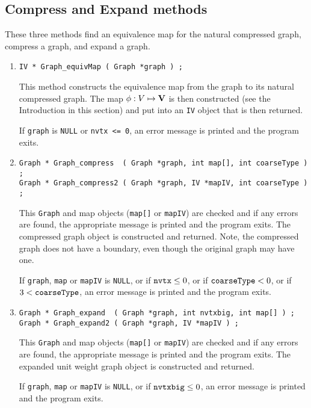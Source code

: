 \subsection{Compress and Expand methods}
\label{subsection:Graph:proto:compress}
\par
These three methods find an equivalence map for the natural
compressed graph, compress a graph, and expand a graph.
\par
\begin{enumerate}
\item
\begin{verbatim}
IV * Graph_equivMap ( Graph *graph ) ;
\end{verbatim}
This method constructs the equivalence map from the graph to its
natural compressed graph.
The map $\phi : V \mapsto {\bf V}$ is then constructed 
(see the Introduction in this section) 
and put into an {\tt IV} object that is then returned.
\par {}
If {\tt graph} is {\tt NULL} or {\tt nvtx <= 0},
an error message is printed and the program exits.
\item
\begin{verbatim}
Graph * Graph_compress  ( Graph *graph, int map[], int coarseType ) ;
Graph * Graph_compress2 ( Graph *graph, IV *mapIV, int coarseType ) ;
\end{verbatim}
This {\tt Graph} and map objects ({\tt map[]} or {\tt mapIV}) are
checked and if any errors are found, the appropriate message is
printed and the program exits.
The compressed graph object is constructed and returned.
Note, the compressed graph does not have a boundary, even though
the original graph may have one.
\par {}
If {\tt graph}, {\tt map} or {\tt mapIV} is {\tt NULL},
or if ${\tt nvtx} \le 0$,
or if ${\tt coarseType} < 0$,
or if $ 3 < {\tt coarseType}$,
an error message is printed and the program exits.
\item
\begin{verbatim}
Graph * Graph_expand  ( Graph *graph, int nvtxbig, int map[] ) ;
Graph * Graph_expand2 ( Graph *graph, IV *mapIV ) ;
\end{verbatim}
This {\tt Graph} and map objects ({\tt map[]} or {\tt mapIV}) are
checked and if any errors are found, the appropriate message is
printed and the program exits.
The expanded unit weight graph object is constructed and returned.
\par {}
If {\tt graph}, {\tt map} or {\tt mapIV} is {\tt NULL},
or if ${\tt nvtxbig} \le 0$,
an error message is printed and the program exits.
\end{enumerate}

